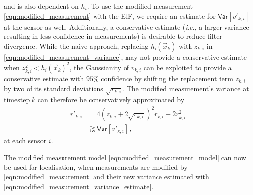 and is also dependent on $h_i$. To use the modified measurement \eqref{eqn:modified_measurement} with the EIF, we require an estimate for $\mathsf{Var}[v'_{k,i}]$ at the sensor as well. Additionally, a conservative estimate (\textit{i.e.}, a larger variance resulting in less confidence in measurements) is desirable to reduce filter divergence. While the naive approach, replacing $h_i(\vec{x}_k)$ with $z_{k,i}$ in \eqref{eqn:modified_measurement_variance}, may not provide a conservative estimate when $z_{k,i}^2 < h_i(\vec{x}_k)^2$, the Gaussianity of $v_{k,i}$ can be exploited to provide a conservative estimate with $95\%$ confidence by shifting the replacement term $z_{k,i}$ by two of its standard deviations $\sqrt{r_{k,i}}$. The modified measurement's variance at timestep $k$ can therefore be conservatively approximated by
\begin{equation}
    \begin{split}
        r'_{k, i} &= 4(z_{k,i} + 2\sqrt{r_{k,i}})^2r_{k,i} + 2r_{k,i}^2 \\
        &\gtrapprox \mathsf{Var}[v'_{k,i}]\,,
    \end{split} \label{eqn:modified_measurement_variance_estimate}
\end{equation}
at each sensor $i$.

The modified measurement model \eqref{eqn:modified_measurement_model} can now be used for localisation, when measurements are modified by \eqref{eqn:modified_measurement} and their new variance estimated with \eqref{eqn:modified_measurement_variance_estimate}.

% 
% 

